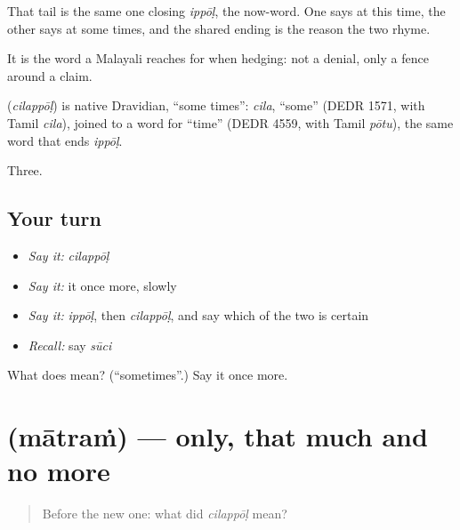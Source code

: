 That tail is the same one closing \emph{ippōḷ}, the now-word. One says at this time, the other says at some times, and the shared ending is the reason the two rhyme.

It is the word a Malayali reaches for when hedging: not a denial, only a fence around a claim.

\begin{cousinweb}
\textbf{} (\emph{cilappōḷ}) is native Dravidian, \textquotedblleft{}some times\textquotedblright{}: \emph{cila}, \textquotedblleft{}some\textquotedblright{} (DEDR 1571, with Tamil \emph{cila}), joined to a word for \textquotedblleft{}time\textquotedblright{} (DEDR 4559, with Tamil \emph{pōtu}), the same word that ends \emph{ippōḷ}.
\end{cousinweb}

\begin{grammarlens}[title={What you've built}]
Three.
\end{grammarlens}

\subsection*{Your turn}
\begin{itemize}
\raggedright
  \item \emph{Say it:} \emph{cilappōḷ}
  \item \emph{Say it:} it once more, slowly
  \item \emph{Say it:} \emph{ippōḷ}, then \emph{cilappōḷ}, and say which of the two is certain
  \item \emph{Recall:} say \emph{sūci}
\end{itemize}

\begin{tcolorbox}[breakable,colback=teal!4,colframe=teal!35!black,title={Before you move on}]
What does  mean? (\textquotedblleft{}sometimes\textquotedblright{}.) Say it once more.
\end{tcolorbox}
\section[\texorpdfstring{\ml{മാത്രം} (mātraṁ)}{മാത്രം (mātraṁ)}]{ (mātraṁ) — only, that much and no more}

\label{lesson:ML-C64-only}



\begin{quote}
Before the new one: what did \emph{cilappōḷ} mean?
\end{quote}

